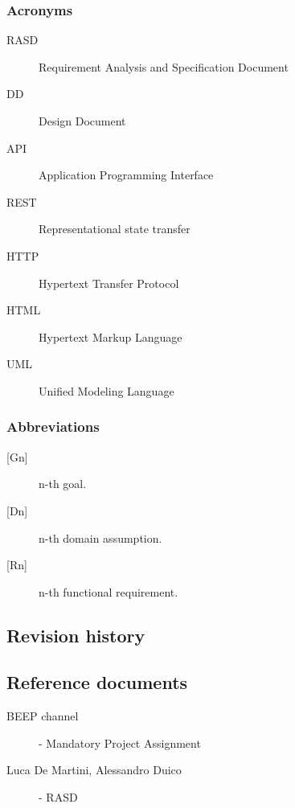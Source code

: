 \subsubsection{Acronyms}

\begin{description}
    \item [RASD] Requirement Analysis and Specification Document
    \item [DD] Design Document
    \item [API] Application Programming Interface
    \item [REST] Representational state transfer
    \item [HTTP] Hypertext Transfer Protocol
    \item [HTML] Hypertext Markup Language
    \item [UML] Unified Modeling Language
\end{description}
\subsubsection{Abbreviations}

\begin{description}
    \item [{[Gn]}] n-th goal.
    \item [{[Dn]}] n-th domain assumption.
    \item [{[Rn]}] n-th functional requirement.
\end{description}

\subsection{Revision history}

\subsection{Reference documents}

\begin{description}
    \item [BEEP channel] - Mandatory Project Assignment
    \item [Luca De Martini, Alessandro Duico] - RASD
\end{description}


